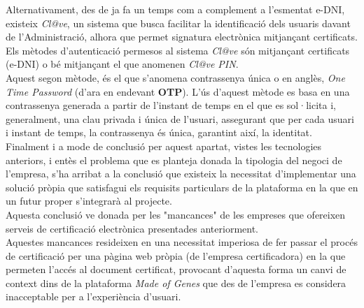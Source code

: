 \newline Alternativament, des de ja fa un temps com a complement a l'esmentat e-DNI, existeix \textit{Cl@ve}, un sistema que busca facilitar la identificació dels usuaris davant de l'Administració, alhora que permet signatura electrònica mitjançant certificats.\\
\newline Els mètodes d'autenticació permesos al sistema \textit{Cl@ve} són mitjançant certificats (e-DNI) o bé mitjançant el que anomenen \textit{Cl@ve PIN}.\\
\newline Aquest segon mètode, és el que s'anomena contrassenya única o en anglès, \textit{One Time Password} (d'ara en endevant \textbf{OTP}). L'ús d'aquest mètode es basa en una contrassenya generada a partir de l'instant de temps en el que es sol·licita i, generalment, una clau privada i única de l'usuari, assegurant que per cada usuari i instant de temps, la contrassenya és única, garantint així, la identitat.\\
\newline Finalment i a mode de conclusió per aquest apartat, vistes les tecnologies anteriors, i entès el problema que es planteja donada la tipologia del negoci de l'empresa, s'ha arribat a la conclusió que existeix la necessitat d'implementar una solució pròpia que satisfagui els requisits particulars de la plataforma en la que en un futur proper s'integrarà al projecte.\\
\newline Aquesta conclusió ve donada per les "mancances" de les empreses que ofereixen serveis de certificació electrònica presentades anteriorment.\\
Aquestes mancances resideixen en una necessitat imperiosa de fer passar el procés de certificació per una pàgina web pròpia (de l'empresa certificadora) en la que permeten l'accés al document certificat, provocant d'aquesta forma un canvi de context dins de la plataforma \textit{Made of Genes} que des de l'empresa es considera inacceptable per a l'experiència d'usuari.





